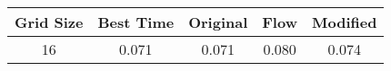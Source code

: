 \begin{tabular}{|c|c|c|c|c|}
\hline
Grid Size & Best Time & Original & Flow & Modified \\
\hline
16 & 0.071 & 0.071 & 0.080 & 0.074 \\
\hline
\end{tabular}